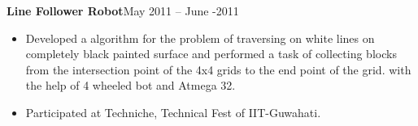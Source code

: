 \documentclass[margin,line]{res}
\begin{document}
\begin{resume}
\begin{itemize}
\end{itemize}
\vspace{0.8 mm}
{\bf Line Follower Robot}\hfill {May 2011 -- June -2011}
\begin{itemize} %
  \setlength{\itemsep}{0.01pt}
  \setlength{\parskip}{0pt}
  \setlength{\parsep}{0pt}
\item Developed a algorithm for the problem of traversing on white lines on completely black painted surface and performed a task of collecting blocks from the intersection point of the 4x4 grids to the end point of the grid. with the help of 4 wheeled bot and Atmega 32.
\item Participated at Techniche, Technical Fest of IIT-Guwahati.

\end{itemize}


\end{resume}
\end{document}
